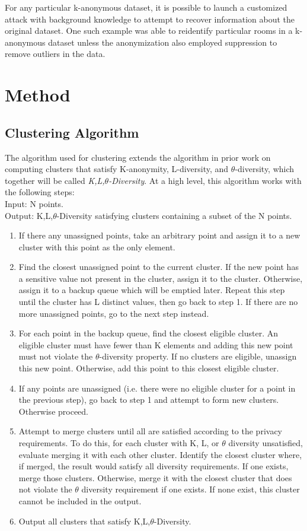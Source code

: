 For any particular k-anonymous dataset, it is possible to launch a customized attack with background knowledge to attempt to recover information about the original dataset. One such example \cite{schweeEval} was able to reidentify particular rooms in a k-anonymous dataset unless the anonymization also employed suppression to remove outliers in the data.

\section{Method}

\subsection{Clustering Algorithm}
\label{section:clusteringAlgo}
The algorithm used for clustering extends the algorithm in prior work\cite{yangEnhanced} on computing clusters that satisfy K-anonymity, L-diversity, and $\theta$-diversity, which together will be called \emph{K,L,$\theta$-Diversity}. At a high level, this algorithm works with the following steps: \\
Input: N points. \\
Output: K,L,$\theta$-Diversity satisfying clusters containing a subset of the N points.
\begin{enumerate}
    \item If there any unassigned points, take an arbitrary point and assign it to a new cluster with this point as the only element.
    \item Find the closest unassigned point to the current cluster. If the new point has a sensitive value not present in the cluster, assign it to the cluster. Otherwise, assign it to a backup queue which will be emptied later. Repeat this step until the cluster has L distinct values, then go back to step 1. If there are no more unassigned points, go to the next step instead.
    \item For each point in the backup queue, find the closest eligible cluster. An eligible cluster must have fewer than K elements and adding this new point must not violate the $\theta$-diversity property. If no clusters are eligible, unassign this new point. Otherwise, add this point to this closest eligible cluster.
    \item If any points are unassigned (i.e. there were no eligible cluster for a point in the previous step), go back to step 1 and attempt to form new clusters. Otherwise proceed.
    \item Attempt to merge clusters until all are satisfied according to the privacy requirements. To do this, for each cluster with K, L, or $\theta$ diversity unsatisfied, evaluate merging it with each other cluster. Identify the closest cluster where, if merged, the result would satisfy all diversity requirements. If one exists, merge those clusters. Otherwise, merge it with the closest cluster that does not violate the $\theta$ diversity requirement if one exists. If none exist, this cluster cannot be included in the output.
    \item Output all clusters that satisfy K,L,$\theta$-Diversity.
\end{enumerate}

